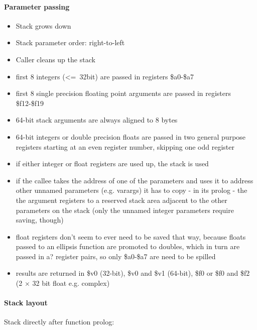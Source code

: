 \paragraph{Parameter passing}

\begin{itemize}
\item Stack grows down
\item Stack parameter order: right-to-left
\item Caller cleans up the stack
\item first 8 integers (\textless=\ 32bit) are passed in registers \$a0-\$a7
\item first 8 single precision floating point arguments are passed in registers \$f12-\$f19
\item 64-bit stack arguments are always aligned to 8 bytes
\item 64-bit integers or double precision floats are passed in two general purpose registers starting at an even register number, skipping one odd register
\item if either integer or float registers are used up, the stack is used
\item if the callee takes the address of one of the parameters and uses it to address other unnamed parameters (e.g. varargs) it has to copy - in its prolog - the the argument registers to a reserved stack area adjacent to the other parameters on the stack (only the unnamed integer parameters require saving, though) %
\item float registers don't seem to ever need to be saved that way, because floats passed to an ellipsis function are promoted to doubles, which in turn are passed in a? register pairs, so only \$a0-\$a7 are need to be spilled
\item results are returned in \$v0 (32-bit), \$v0 and \$v1 (64-bit), \$f0 or \$f0 and \$f2 (2 $\times$ 32 bit float e.g. complex)
\end{itemize}

\paragraph{Stack layout}

Stack directly after function prolog:\\

